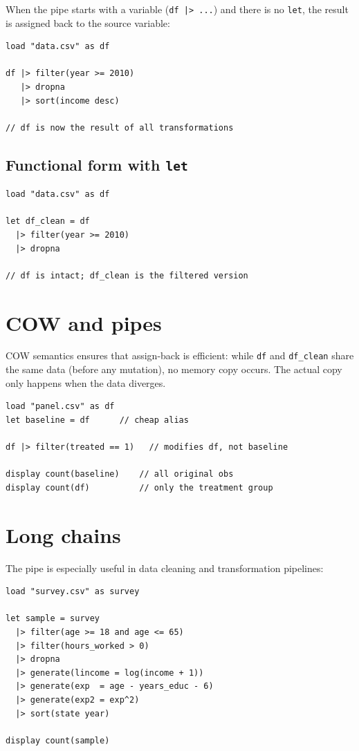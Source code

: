 When the pipe starts with a variable (\lstinline{df |> ...}) and there is
no \lstinline{let}, the result is assigned back to the source variable:

\begin{lstlisting}[caption={Assign-back: df is modified}]
load "data.csv" as df

df |> filter(year >= 2010)
   |> dropna
   |> sort(income desc)

// df is now the result of all transformations
\end{lstlisting}

\subsection*{Functional form with \texttt{let}}

\begin{lstlisting}[caption={let preserves the original}]
load "data.csv" as df

let df_clean = df
  |> filter(year >= 2010)
  |> dropna

// df is intact; df_clean is the filtered version
\end{lstlisting}

\section{COW and pipes}

COW semantics ensures that assign-back is efficient: while \lstinline{df}
and \lstinline{df_clean} share the same data (before any mutation), no
memory copy occurs. The actual copy only happens when the data diverges.

\begin{lstlisting}[caption={Preserving baseline with let}]
load "panel.csv" as df
let baseline = df      // cheap alias

df |> filter(treated == 1)   // modifies df, not baseline

display count(baseline)    // all original obs
display count(df)          // only the treatment group
\end{lstlisting}

\section{Long chains}

The pipe is especially useful in data cleaning and transformation
pipelines:

\begin{lstlisting}[caption={Complete preparation pipeline}]
load "survey.csv" as survey

let sample = survey
  |> filter(age >= 18 and age <= 65)
  |> filter(hours_worked > 0)
  |> dropna
  |> generate(lincome = log(income + 1))
  |> generate(exp  = age - years_educ - 6)
  |> generate(exp2 = exp^2)
  |> sort(state year)

display count(sample)
\end{lstlisting}

